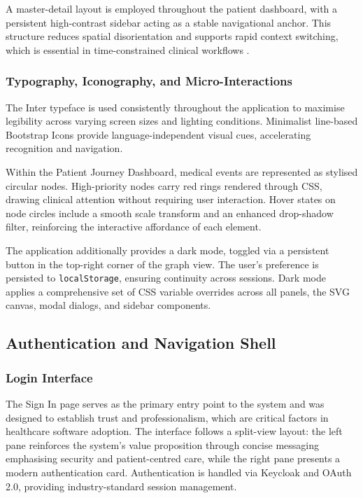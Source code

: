 A master-detail layout is employed throughout the patient dashboard, with a
persistent high-contrast sidebar acting as a stable navigational anchor. This
structure reduces spatial disorientation and supports rapid context switching,
which is essential in time-constrained clinical workflows
\cite{patientSafetyDashboards2021}.

\subsubsection{Typography, Iconography, and Micro-Interactions}

The Inter typeface is used consistently throughout the application to maximise
legibility across varying screen sizes and lighting conditions. Minimalist
line-based Bootstrap Icons provide language-independent visual cues,
accelerating recognition and navigation.

Within the Patient Journey Dashboard, medical events are represented as
stylised circular nodes. High-priority nodes carry red rings rendered through
CSS, drawing clinical attention without requiring user interaction. Hover
states on node circles include a smooth scale transform and an enhanced
drop-shadow filter, reinforcing the interactive affordance of each element.

The application additionally provides a dark mode, toggled via a persistent
button in the top-right corner of the graph view. The user's preference is
persisted to \texttt{localStorage}, ensuring continuity across sessions.
Dark mode applies a comprehensive set of CSS variable overrides across all
panels, the SVG canvas, modal dialogs, and sidebar components.

\subsection{Authentication and Navigation Shell}

\subsubsection{Login Interface}

The Sign In page serves as the primary entry point to the system and was
designed to establish trust and professionalism, which are critical factors in
healthcare software adoption. The interface follows a split-view layout:
the left pane reinforces the system's value proposition through concise
messaging emphasising security and patient-centred care, while the right pane
presents a modern authentication card. Authentication is handled via Keycloak
and OAuth 2.0, providing industry-standard session management.

